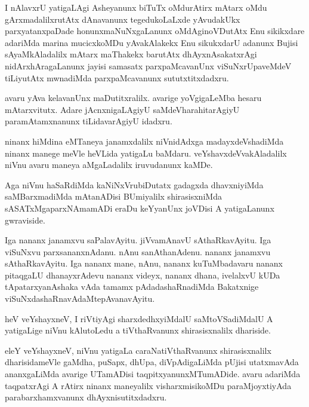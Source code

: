 \documentclass{article}
\begin{document}
\begin{mn}
I nAlavxrU yatigaLAgi Asheyanunx biTuTx oMdurAtirx mAtarx oMdu gArxmadalilxrutAtx dAnavanunx 
tegedukoLaLxde yAvudakUkx parxyatanxpaDade honunxmaNuNxgaLanunx oMdAginoVDutAtx Enu sikikxdare 
adariMda marina mucicxkoMDu yAvakAlakekx Enu sikukxdarU adanunx Bujisi sAyaMkAladalilx mAtarx 
maThakekx  barutAtx dhAyxnAsakatxrAgi nidArxhAragaLanunx jayisi samasatx parxpaMcavanUnx 
viSuNxrUpaveMdeV tiLiyutAtx mwnadiMda parxpaMcavanunx sututxtitxdadxru.
\end{mn}

\begin{mn}
avaru yAva kelavanUnx  maDutitxralilx. avarige yoVgigaLeMba hesaru mAtarxvitutx. Adare 
jAcnxnigaLAgiyU saMdeVharahitarAgiyU paramAtamxnanunx tiLidavarAgiyU idadxru.
\end{mn}

\begin{mn}
ninanx hiMdina eMTaneya janamxdalilx niVnidAdxga madayxdeVshadiMda ninanx manege meVle heVLida 
yatigaLu baMdaru. veYshavxdeVvakAladalilx niVnu avaru maneya aMgaLadalilx iruvudanunx kaMDe.
\end{mn}

\begin{mn}
Aga niVnu haSaRdiMda kaNiNxVrubiDutatx gadagxda dhavxniyiMda saMBarxmadiMda mAtanADisi BUmiyalilx 
shirasisxniMda sASATxMgaparxNAmamADi eraDu keYyanUnx joVDisi A yatigaLanunx gwraviside.
\end{mn}

\begin{mn}
Iga nananx janamxvu saPalavAyitu. jiVvamAnavU sAthaRkavAyitu. Iga viSuNxvu parxsananxnAdanu. nAnu
sanAthanAdenu. nananx janamxvu sAthaRkavAyitu. Iga nananx mane, nAnu, nananx kuTuMbadavaru nananx 
pitaqgaLU dhanayxrAdevu nananx videyx, nananx dhana, ivelalxvU kUDa tApatarxyanAshaka  vAda tamamx
pAdadashaRnadiMda Bakatxnige viSuNxdashaRnavAdaMtepAvanavAyitu.
\end{mn}

\begin{mn}
heV veYshayxneV, I riVtiyAgi sharxdedhxyiMdalU saMtoVSadiMdalU A yatigaLige niVnu kAlutoLedu a
tiVthaRvanunx shirasisxnalilx dhariside.
\end{mn}

\begin{mn}
eleY veYshayxneV, niVnu yatigaLa caraNatiVthaRvanunx shirasisxnalilx dharisidameVle gaMdha, 
puSapx, dhUpa, diVpAdigaLiMda pUjisi utatxmavAda ananxgaLiMda avarige UTamADisi 
taqpitxyanunxMTumADide. avaru adariMda taqpatxrAgi A rAtirx ninanx  maneyalilx visharxmisikoMDu 
paraMjoyxtiyAda parabarxhamxvanunx dhAyxnisutitxdadxru.
\end{mn}
\end{document}
